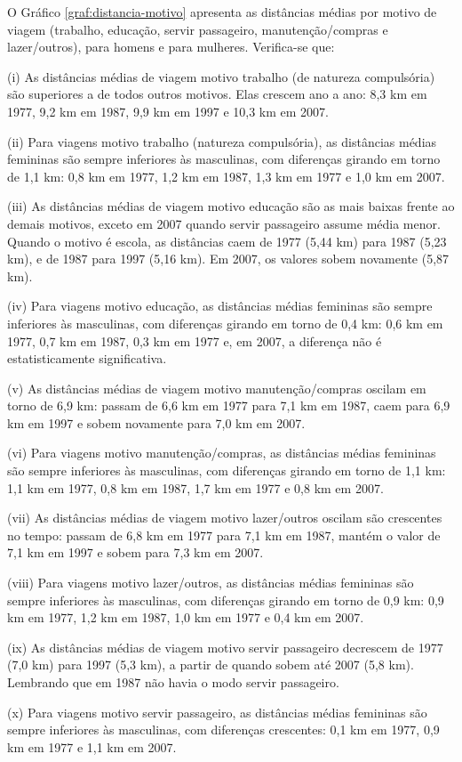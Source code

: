 O Gráfico \ref{graf:distancia-motivo} apresenta as distâncias médias por motivo de viagem (trabalho, educação, servir passageiro, manutenção/compras e lazer/outros), para homens e para mulheres. Verifica-se que:
\begin{compactitem}[]
\item (i) As distâncias médias de viagem motivo trabalho (de natureza compulsória) são superiores a de todos outros motivos. Elas crescem ano a ano: 8,3 km em 1977, 9,2 km em 1987, 9,9 km em 1997 e 10,3 km em 2007.
\item (ii) Para viagens motivo trabalho (natureza compulsória), as distâncias médias femininas são sempre inferiores às masculinas, com diferenças girando em torno de 1,1 km: 0,8 km em 1977, 1,2 km em 1987, 1,3 km em 1977 e 1,0 km em 2007.
\item (iii) As distâncias médias de viagem motivo educação são as mais baixas frente ao demais motivos, exceto em 2007 quando servir passageiro assume média menor. Quando o motivo é escola, as distâncias caem de 1977 (5,44 km) para 1987 (5,23 km), e de 1987 para 1997 (5,16 km). Em 2007, os valores sobem novamente (5,87 km).
\item (iv) Para viagens motivo educação, as distâncias médias femininas são sempre inferiores às masculinas, com diferenças girando em torno de 0,4 km: 0,6 km em 1977, 0,7 km em 1987, 0,3 km em 1977 e, em 2007, a diferença não é estatisticamente significativa.
\item (v) As distâncias médias de viagem motivo manutenção/compras oscilam em torno de 6,9 km: passam de 6,6 km em 1977 para 7,1 km em 1987, caem para 6,9 km em 1997 e sobem novamente para 7,0 km em 2007. 
\item (vi) Para viagens motivo manutenção/compras, as distâncias médias femininas são sempre inferiores às masculinas, com diferenças girando em torno de 1,1 km: 1,1 km em 1977, 0,8 km em 1987, 1,7 km em 1977 e 0,8 km em 2007.
\item (vii) As distâncias médias de viagem motivo lazer/outros oscilam são crescentes no tempo: passam de 6,8 km em 1977 para 7,1 km em 1987, mantém o valor de 7,1 km em 1997 e sobem para 7,3 km em 2007. 
\item (viii) Para viagens motivo lazer/outros, as distâncias médias femininas são sempre inferiores às masculinas, com diferenças girando em torno de 0,9 km: 0,9 km em 1977, 1,2 km em 1987, 1,0 km em 1977 e 0,4 km em 2007.
\item (ix) As distâncias médias de viagem motivo servir passageiro decrescem de 1977 (7,0 km) para 1997 (5,3 km), a partir de quando sobem até 2007 (5,8 km). Lembrando que em 1987 não havia o modo servir passageiro.
\item (x) Para viagens motivo servir passageiro, as distâncias médias femininas são sempre inferiores às masculinas, com diferenças crescentes: 0,1 km em 1977, 0,9 km em 1977 e 1,1 km em 2007.
\end{compactitem}


